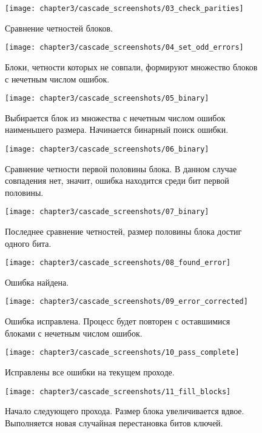 \begin{figure}[h]
  \texttt{[image: chapter3/cascade\_screenshots/03\_check\_parities]}
  \caption{Сравнение четностей блоков.}
\end{figure}

\begin{figure}[h]
  \texttt{[image: chapter3/cascade\_screenshots/04\_set\_odd\_errors]}
  \caption{Блоки, четности которых не совпали, формируют множество блоков с нечетным числом ошибок.}
\end{figure}

\begin{figure}[h]
  \texttt{[image: chapter3/cascade\_screenshots/05\_binary]}
  \caption{Выбирается блок из множества с нечетным числом ошибок наименьшего размера. Начинается бинарный поиск ошибки.}
\end{figure}

\begin{figure}[h]
  \texttt{[image: chapter3/cascade\_screenshots/06\_binary]}
  \caption{Сравнение четности первой половины блока. В данном случае совпадения нет, значит, ошибка находится среди бит первой половины.}
\end{figure}

\begin{figure}[h]
  \texttt{[image: chapter3/cascade\_screenshots/07\_binary]}
  \caption{Последнее сравнение четностей, размер половины блока достиг одного бита.}
\end{figure}

\begin{figure}[h]
  \texttt{[image: chapter3/cascade\_screenshots/08\_found\_error]}
  \caption{Ошибка найдена.}
\end{figure}

\begin{figure}[h]
  \texttt{[image: chapter3/cascade\_screenshots/09\_error\_corrected]}
  \caption{Ошибка исправлена. Процесс будет повторен с оставшимися блоками с нечетным числом ошибок.}
\end{figure}

\begin{figure}[h]
  \texttt{[image: chapter3/cascade\_screenshots/10\_pass\_complete]}
  \caption{Исправлены все ошибки на текущем проходе.}
\end{figure}

\begin{figure}[h]
  \texttt{[image: chapter3/cascade\_screenshots/11\_fill\_blocks]}
  \caption{Начало следующего прохода. Размер блока увеличивается вдвое. Выполняется новая случайная перестановка битов ключей.}
\end{figure}

